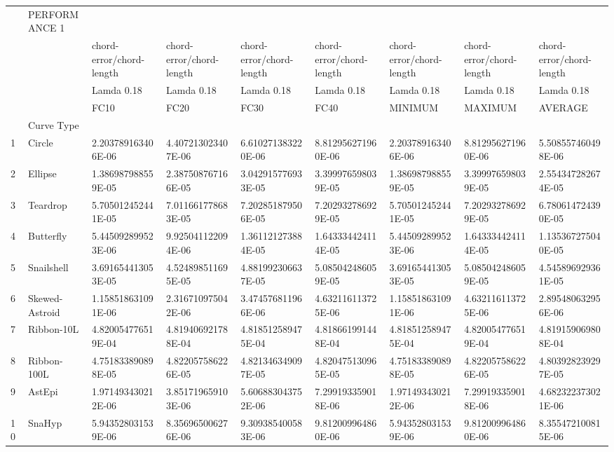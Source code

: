 \begin{landscape}
\begin{table}[ht]
{\begin{tabular}{ p{0.4cm} p{4.00cm} p{4.00cm} p{4.0cm} p{4.00cm} p{4.00cm} p{4.0cm} p{4.00cm} p{4.00cm} }
	&	PERFORMANCE 1	&		&		&		&		&		&		&		\\
	&					&	chord-error/chord-length	&	chord-error/chord-length	&	chord-error/chord-length	&	chord-error/chord-length	&	chord-error/chord-length	&	chord-error/chord-length	&	chord-error/chord-length	\\
	&					&	Lamda 0.18			&	Lamda 0.18			&	Lamda 0.18			&	Lamda 0.18			&	Lamda 0.18			&	Lamda 0.18			&	Lamda 0.18	\\
	&					&	FC10				&	FC20				&	FC30				&	FC40				&	MINIMUM				&	MAXIMUM				&	AVERAGE	\\
	&	Curve Type		&		&		&		&		&		&		&		\\
1	&	Circle			&	2.203789163406E-06	&	4.407213023407E-06	&	6.610271383220E-06	&	8.812956271960E-06	&	2.203789163406E-06	&	8.812956271960E-06	&	5.508557460498E-06	\\
2	&	Ellipse			&	1.386987988559E-05	&	2.387508767166E-05	&	3.042915776933E-05	&	3.399976598039E-05	&	1.386987988559E-05	&	3.399976598039E-05	&	2.554347282674E-05	\\
3	&	Teardrop		&	5.705012452441E-05	&	7.011661778683E-05	&	7.202851879506E-05	&	7.202932786929E-05	&	5.705012452441E-05	&	7.202932786929E-05	&	6.780614724390E-05	\\
4	&	Butterfly		&	5.445092899523E-06	&	9.925041122094E-06	&	1.361121273884E-05	&	1.643334424114E-05	&	5.445092899523E-06	&	1.643334424114E-05	&	1.135367275040E-05	\\
5	&	Snailshell		&	3.691654413053E-05	&	4.524898511695E-05	&	4.881992306637E-05	&	5.085042486059E-05	&	3.691654413053E-05	&	5.085042486059E-05	&	4.545896929361E-05	\\
6	&	Skewed-Astroid	&	1.158518631091E-06	&	2.316710975042E-06	&	3.474576811966E-06	&	4.632116113725E-06	&	1.158518631091E-06	&	4.632116113725E-06	&	2.895480632956E-06	\\
7	&	Ribbon-10L		&	4.820054776519E-04	&	4.819406921788E-04	&	4.818512589475E-04	&	4.818661991448E-04	&	4.818512589475E-04	&	4.820054776519E-04	&	4.819159069808E-04	\\
8	&	Ribbon-100L		&	4.751833890898E-05	&	4.822057586226E-05	&	4.821346349097E-05	&	4.820475130965E-05	&	4.751833890898E-05	&	4.822057586226E-05	&	4.803928239297E-05	\\
9	&	AstEpi			&	1.971493430212E-06	&	3.851719659103E-06	&	5.606883043752E-06	&	7.299193359018E-06	&	1.971493430212E-06	&	7.299193359018E-06	&	4.682322373021E-06	\\
10	&	SnaHyp			&	5.943528031539E-06	&	8.356965006276E-06	&	9.309385400583E-06	&	9.812009964860E-06	&	5.943528031539E-06	&	9.812009964860E-06	&	8.355472100815E-06	\\

\end{tabular}}
\end{table}
\end{landscape}
